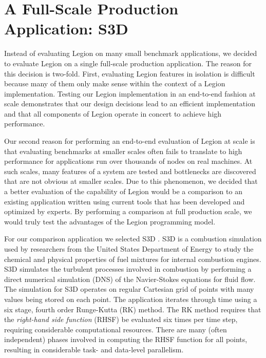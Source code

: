 

\chapter{A Full-Scale Production Application: S3D}
\label{chapter:s3d}

Instead of evaluating Legion on many small benchmark
applications, we decided to evaluate Legion on a single 
full-scale production application. The reason for this
decision is two-fold.  First, evaluating Legion features
in isolation is difficult because many of them only make 
sense within the context of a Legion implementation. 
Testing our Legion implementation in an end-to-end fashion
at scale demonstrates that our design decisions lead
to an efficient implementation and that all components 
of Legion operate in concert to achieve high performance.

Our second reason for performing an end-to-end evaluation
of Legion at scale is that evaluating benchmarks at
smaller scales often fails to translate to high performance
for applications run over thousands of nodes
on real machines. At such scales, many features
of a system are tested and bottlenecks are discovered
that are not obvious at smaller scales. Due to this
phenomenon, we decided that a better evaluation of
the capability of Legion would be a comparison to 
an existing application written using current tools
that has been developed and optimized by experts.
By performing a comparison at full production
scale, we would truly test the advantages of the
Legion programming model.

For our comparison application we selected S3D 
\cite{S3D09}. S3D is a combustion simulation used
by researchers from the United States Department
of Energy to study the chemical and physical 
properties of fuel mixtures for internal combustion
engines. S3D simulates the turbulent processes 
involved in combustion by performing a direct
numerical simulation (DNS) of the Navier-Stokes
equations for fluid flow. The simulation for S3D
operates on regular Cartesian grid of points with
many values being stored on each point. The 
application iterates through time using a six 
stage, fourth order Runge-Kutta (RK) method. The 
RK method requires that the {\em right-hand side
function} (RHSF) be evaluated six times per
time step, requiring considerable computational
resources. There are many (often independent)
phases involved in computing the RHSF function
for all points, resulting in considerable task-
and data-level parallelism.

